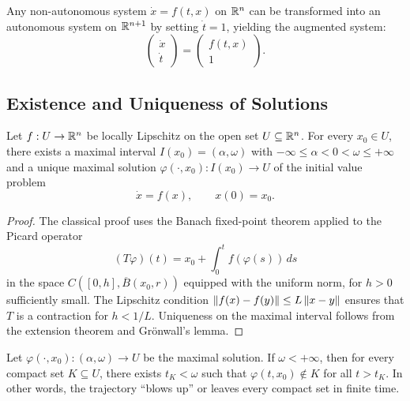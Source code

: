 \begin{remark}
Any non-autonomous system $\dot{x} = f(t,x)$ on $\mathbb{R}^n$ can be transformed
into an autonomous system on $\mathbb{R}^{n+1}$ by setting $\dot{t} = 1$, yielding
the augmented system:
\[
    \begin{pmatrix} \dot{x} \\ \dot{t} \end{pmatrix} =
    \begin{pmatrix} f(t,x) \\ 1 \end{pmatrix}.
\]
\end{remark}

\subsection{Existence and Uniqueness of Solutions}

\begin{theorem}
\label{thm:picard-lindelof}
Let $f : U \to \mathbb{R}^n$ be locally Lipschitz on the open set $U \subseteq \mathbb{R}^n$.
For every $x_0 \in U$, there exists a maximal interval
$I(x_0) = (\alpha, \omega)$ with $-\infty \leq \alpha < 0 < \omega \leq +\infty$
and a unique maximal solution $\varphi(\cdot, x_0) : I(x_0) \to U$ of the
initial value problem
\[
    \dot{x} = f(x), \qquad x(0) = x_0.
\]
\end{theorem}

\begin{proof}
The classical proof uses the Banach fixed-point theorem applied to the
Picard operator
\[
    (T\varphi)(t) = x_0 + \int_0^t f(\varphi(s))\, ds
\]
in the space $C([0,h], \overline{B}(x_0, r))$ equipped with the uniform norm,
for $h > 0$ sufficiently small. The Lipschitz condition
$\left\| f(x) - f(y) \right\| \leq L\left\| x - y \right\|$ ensures that $T$ is a contraction
for $h < 1/L$. Uniqueness on the maximal interval follows from the
extension theorem and Gr\"onwall's lemma.
\end{proof}

\begin{theorem}
\label{thm:blowup}
Let $\varphi(\cdot, x_0) : (\alpha, \omega) \to U$ be the maximal solution.
If $\omega < +\infty$, then for every compact set $K \subseteq U$, there
exists $t_K < \omega$ such that $\varphi(t, x_0) \notin K$ for all $t > t_K$.
In other words, the trajectory ``blows up'' or leaves every compact set in
finite time.
\end{theorem}

